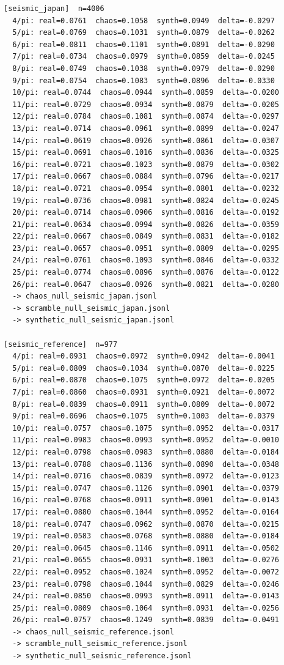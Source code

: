\documentclass[11pt, letterpaper, openany]{book}
\begin{document}
\begin{empiricalbox}
\begin{lstlisting}[style=terminal]
[seismic_japan]  n=4006
  4/pi: real=0.0761  chaos=0.1058  synth=0.0949  delta=-0.0297
  5/pi: real=0.0769  chaos=0.1031  synth=0.0879  delta=-0.0262
  6/pi: real=0.0811  chaos=0.1101  synth=0.0891  delta=-0.0290
  7/pi: real=0.0734  chaos=0.0979  synth=0.0859  delta=-0.0245
  8/pi: real=0.0749  chaos=0.1038  synth=0.0979  delta=-0.0290
  9/pi: real=0.0754  chaos=0.1083  synth=0.0896  delta=-0.0330
  10/pi: real=0.0744  chaos=0.0944  synth=0.0859  delta=-0.0200
  11/pi: real=0.0729  chaos=0.0934  synth=0.0879  delta=-0.0205
  12/pi: real=0.0784  chaos=0.1081  synth=0.0874  delta=-0.0297
  13/pi: real=0.0714  chaos=0.0961  synth=0.0899  delta=-0.0247
  14/pi: real=0.0619  chaos=0.0926  synth=0.0861  delta=-0.0307
  15/pi: real=0.0691  chaos=0.1016  synth=0.0836  delta=-0.0325
  16/pi: real=0.0721  chaos=0.1023  synth=0.0879  delta=-0.0302
  17/pi: real=0.0667  chaos=0.0884  synth=0.0796  delta=-0.0217
  18/pi: real=0.0721  chaos=0.0954  synth=0.0801  delta=-0.0232
  19/pi: real=0.0736  chaos=0.0981  synth=0.0824  delta=-0.0245
  20/pi: real=0.0714  chaos=0.0906  synth=0.0816  delta=-0.0192
  21/pi: real=0.0634  chaos=0.0994  synth=0.0826  delta=-0.0359
  22/pi: real=0.0667  chaos=0.0849  synth=0.0831  delta=-0.0182
  23/pi: real=0.0657  chaos=0.0951  synth=0.0809  delta=-0.0295
  24/pi: real=0.0761  chaos=0.1093  synth=0.0846  delta=-0.0332
  25/pi: real=0.0774  chaos=0.0896  synth=0.0876  delta=-0.0122
  26/pi: real=0.0647  chaos=0.0926  synth=0.0821  delta=-0.0280
  -> chaos_null_seismic_japan.jsonl
  -> scramble_null_seismic_japan.jsonl
  -> synthetic_null_seismic_japan.jsonl

[seismic_reference]  n=977
  4/pi: real=0.0931  chaos=0.0972  synth=0.0942  delta=-0.0041
  5/pi: real=0.0809  chaos=0.1034  synth=0.0870  delta=-0.0225
  6/pi: real=0.0870  chaos=0.1075  synth=0.0972  delta=-0.0205
  7/pi: real=0.0860  chaos=0.0931  synth=0.0921  delta=-0.0072
  8/pi: real=0.0839  chaos=0.0911  synth=0.0809  delta=-0.0072
  9/pi: real=0.0696  chaos=0.1075  synth=0.1003  delta=-0.0379
  10/pi: real=0.0757  chaos=0.1075  synth=0.0952  delta=-0.0317
  11/pi: real=0.0983  chaos=0.0993  synth=0.0952  delta=-0.0010
  12/pi: real=0.0798  chaos=0.0983  synth=0.0880  delta=-0.0184
  13/pi: real=0.0788  chaos=0.1136  synth=0.0890  delta=-0.0348
  14/pi: real=0.0716  chaos=0.0839  synth=0.0972  delta=-0.0123
  15/pi: real=0.0747  chaos=0.1126  synth=0.0901  delta=-0.0379
  16/pi: real=0.0768  chaos=0.0911  synth=0.0901  delta=-0.0143
  17/pi: real=0.0880  chaos=0.1044  synth=0.0952  delta=-0.0164
  18/pi: real=0.0747  chaos=0.0962  synth=0.0870  delta=-0.0215
  19/pi: real=0.0583  chaos=0.0768  synth=0.0880  delta=-0.0184
  20/pi: real=0.0645  chaos=0.1146  synth=0.0911  delta=-0.0502
  21/pi: real=0.0655  chaos=0.0931  synth=0.1003  delta=-0.0276
  22/pi: real=0.0952  chaos=0.1024  synth=0.0952  delta=-0.0072
  23/pi: real=0.0798  chaos=0.1044  synth=0.0829  delta=-0.0246
  24/pi: real=0.0850  chaos=0.0993  synth=0.0911  delta=-0.0143
  25/pi: real=0.0809  chaos=0.1064  synth=0.0931  delta=-0.0256
  26/pi: real=0.0757  chaos=0.1249  synth=0.0839  delta=-0.0491
  -> chaos_null_seismic_reference.jsonl
  -> scramble_null_seismic_reference.jsonl
  -> synthetic_null_seismic_reference.jsonl


\end{lstlisting}
\end{empiricalbox}
\end{document}
